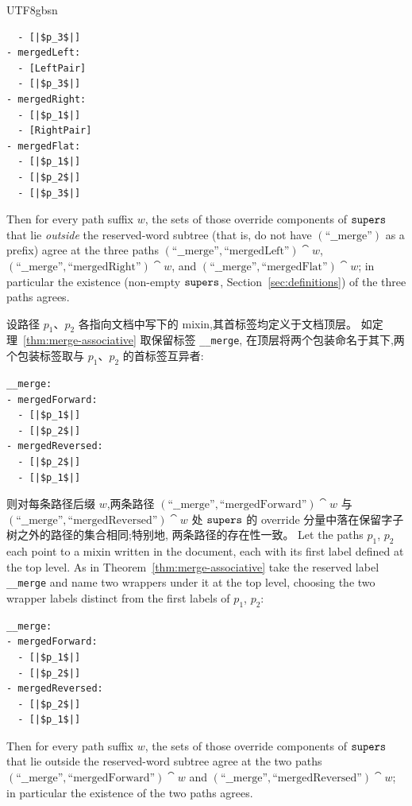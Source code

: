 \begin{CJK*}{UTF8}{gbsn}
\begin{theorem}
\begin{verbatim}
  - [|$p_3$|]
- mergedLeft:
  - [LeftPair]
  - [|$p_3$|]
- mergedRight:
  - [|$p_1$|]
  - [RightPair]
- mergedFlat:
  - [|$p_1$|]
  - [|$p_2$|]
  - [|$p_3$|]
  \end{verbatim}
  Then for every path suffix $w$, the sets of those override
  components of $\mathtt{supers}$ that lie \emph{outside} the reserved-word
  subtree (that is, do not have $(\text{``\_\_merge''})$ as a
  prefix) agree at the three paths
  $(\text{``\_\_merge''},\allowbreak \text{``mergedLeft''}) \cat w$,
  $(\text{``\_\_merge''},\allowbreak \text{``mergedRight''}) \cat w$, and
  $(\text{``\_\_merge''},\allowbreak \text{``mergedFlat''}) \cat w$; in
  particular the existence (non-empty $\mathtt{supers}$,
  Section~\ref{sec:definitions}) of the three paths agrees.
  \fi
\end{theorem}

\begin{theorem}\label{thm:merge-commutative}
  \ifPaperChinese
  设路径 $p_1$、$p_2$ 各指向文档中写下的 mixin,其首标签均定义于文档顶层。
  如定理~\ref{thm:merge-associative} 取保留标签 \texttt{__merge},
  在顶层将两个包装命名于其下,两个包装标签取与 $p_1$、$p_2$ 的首标签互异者:
  \begin{verbatim}
__merge:
- mergedForward:
  - [|$p_1$|]
  - [|$p_2$|]
- mergedReversed:
  - [|$p_2$|]
  - [|$p_1$|]
  \end{verbatim}
  则对每条路径后缀 $w$,两条路径
  $(\text{``\_\_merge''}, \text{``mergedForward''}) \cat w$ 与
  $(\text{``\_\_merge''}, \text{``mergedReversed''}) \cat w$ 处
  $\mathtt{supers}$ 的 override 分量中落在保留字子树之外的路径的集合相同;特别地,
  两条路径的存在性一致。
  \else
  Let the paths $p_1$, $p_2$ each point to a mixin written in the
  document, each with its first label defined at the top level. As in
  Theorem~\ref{thm:merge-associative} take the reserved label
  \texttt{__merge} and name two wrappers under it at the top
  level, choosing the two wrapper labels distinct from the first labels
  of $p_1$, $p_2$:
  \begin{verbatim}
__merge:
- mergedForward:
  - [|$p_1$|]
  - [|$p_2$|]
- mergedReversed:
  - [|$p_2$|]
  - [|$p_1$|]
  \end{verbatim}
  Then for every path suffix $w$, the sets of those override
  components of $\mathtt{supers}$ that lie outside the reserved-word subtree
  agree at the two paths
  $(\text{``\_\_merge''},\allowbreak \text{``mergedForward''}) \cat w$ and
  $(\text{``\_\_merge''},\allowbreak \text{``mergedReversed''}) \cat w$; in
  particular the existence of the two paths agrees.
  \fi
\end{theorem}


\end{CJK*}
